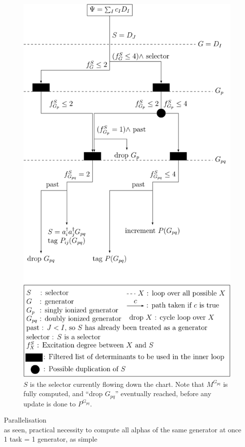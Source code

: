 \documentclass[./thesis.tex]{subfiles}
\begin{document}
\begin{figure}[h!]
	\begin{center}
		\includegraphics[height=0.90\textheight]{figures/cipsi/selection}
	\end{center}
        \caption{\label{fig:selection}
        $S$ is the selector currently flowing down the chart.
        Note that $M^{G_{pq}}$ is fully computed, and ``drop $G_{pq}$'' eventually reached, before any update is done to $P^{G_{pq}}$.
	}	
\end{figure}

Parallelisation \\
as seen, practical necessity to compute all alphas of the same generator at once \\
1 task = 1 generator, as simple \\
\end{document}
